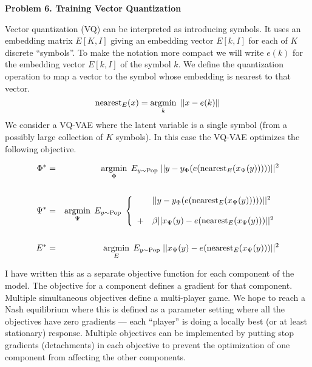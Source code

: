 \documentclass{article}
\newcommand{\solution}[1]{}
\begin{document}
\solution{Yes, the discreteness of $z$ is an issue. This is true independent of the nature of $s$. A differential change in parameters will not change a discrete $z$ and $z.\grad = 0$.
  So the standard back-propagation into the encoder fails.  VQ-VAE back-propagates into the encoder using a K-means loss term together with straight-through gradients.
  Discreteness of $s$ is not a problem.}


\bigskip
{\bf Problem 6. Training Vector Quantization}

Vector quantization (VQ) can be interpreted as introducing symbols.  It uses an embedding matrix $E[K,I]$ giving an embedding vector $E[k,I]$
for each of $K$ discrete ``symbols''.
To make the notation more compact we will write $e(k)$ for the embedding vector $E[k,I]$ of the symbol $k$.
We define the quantization operation to map a vector to the symbol whose embedding is nearest to that vector.
$$\mathrm{nearest}_E(x) = \operatorname*{argmin}_k\;||x - e(k)||$$
We consider a VQ-VAE where the latent variable is a single symbol (from a possibly large collection of $K$ symbols).  In this case the VQ-VAE optimizes the following objective.

\begin{eqnarray}
  \label{eq:VQPhi}
  \Phi^* & = & \operatorname*{argmin}_{\Phi}\;E_{y \sim \mathrm{Pop}}\; ||y-y_\Phi(e(\mathrm{nearest}_E(x_\Psi(y)))))||^2 \\
  \nonumber \\
  \label{eq:VQPsi}
  \Psi^* & = & \operatorname*{argmin}_{\Psi}\;E_{y \sim \mathrm{Pop}}\;\left\{\begin{array}{ll} &||y-y_\Phi(e(\mathrm{nearest}_E(x_\Psi(y)))))||^2
  \\ \\ + & \beta||x_\Psi(y) - e(\mathrm{nearest}_E(x_\Psi(y)))||^2\end{array}\right. \\
  \nonumber \\
  \label{eq:VQE}
  E^* & = & \operatorname*{argmin}_E \;E_{y \sim \mathrm{Pop}}\;||x_\Psi(y) - e(\mathrm{nearest}_E(x_\Psi(y)))||^2
\end{eqnarray}

I have written this as a separate objective function for each component of the model.  The objective for a component defines a gradient for that component.
Multiple simultaneous objectives define a multi-player game.  We hope to reach a Nash equilibrium where this is defined as a parameter setting
where all the objectives have zero gradients --- each ``player'' is doing a locally best (or at least stationary) response.
Multiple objectives can be implemented by putting stop gradients (detachments) in each objective to prevent the optimization of one component from affecting the other
components.
\end{document}

